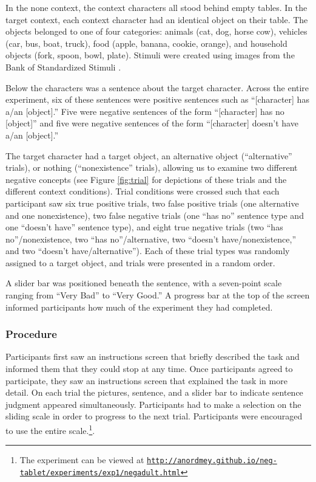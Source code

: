 \documentclass[man, noapacite]{apa2}
\begin{document}
In the none context, the context characters all stood behind empty tables. In the target context, each context character had an identical object on their table. The objects belonged to one of four categories: animals (cat, dog, horse cow), vehicles (car, bus, boat, truck), food (apple, banana, cookie, orange), and household objects (fork, spoon, bowl, plate). Stimuli were created using images from the Bank of Standardized Stimuli \cite{brodeur2010}.

Below the characters was a sentence about the target character. Across the entire experiment, six of these sentences were positive sentences such as ``[character] has a/an [object].'' Five were negative sentences of the form ``[character] has no [object]'' and five were negative sentences of the form ``[character] doesn't have a/an [object].''

The target character had a target object, an alternative object (``alternative'' trials), or nothing (``nonexistence'' trials), allowing us to examine two different negative concepts (see Figure \ref{fig:trial} for depictions of these trials and the different context conditions). Trial conditions were crossed such that each participant saw six true positive trials, two false positive trials (one alternative and one nonexistence), two false negative trials (one ``has no'' sentence type and one ``doesn't have'' sentence type), and eight true negative trials (two ``has no''/nonexistence, two ``has no''/alternative, two ``doesn't have/nonexistence,'' and two ``doesn't have/alternative''). Each of these trial types was randomly assigned to a target object, and trials were presented in a random order.

A slider bar was positioned beneath the sentence, with a seven-point scale ranging from ``Very Bad'' to ``Very Good.'' A progress bar at the top of the screen informed participants how much of the experiment they had completed.

\subsubsection{Procedure}

Participants first saw an instructions screen that briefly described the task and informed them that they could stop at any time. Once participants agreed to participate, they saw an instructions screen that explained the task in more detail. On each trial the pictures, sentence, and a slider bar to indicate sentence judgment appeared simultaneously. Participants had to make a selection on the sliding scale in order to progress to the next trial. Participants were encouraged to use the entire scale.\footnote{The experiment can be viewed at \href{http://anordmey.github.io/neg-tablet/experiments/exp1/negadult.html}{\nolinkurl{http://anordmey.github.io/neg-tablet/experiments/exp1/negadult.html}}}.
\end{document}
